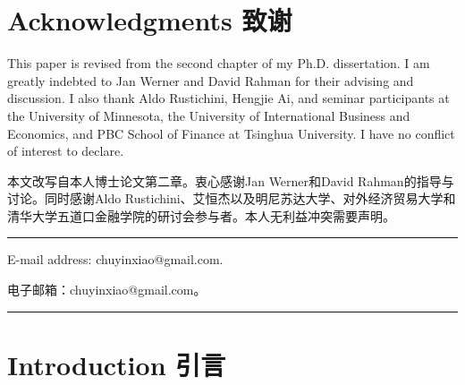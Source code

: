 \documentclass[12pt,a4paper]{article}
\newenvironment{original}{%
  \par\vspace{4pt}\noindent%
  \color{black}%
  \ignorespaces
}{%
  \par\vspace{2pt}%
}
\newenvironment{translation}{%
  \par\vspace{2pt}\noindent%
  \color{transblue}%
  \ignorespaces
}{%
  \par\vspace{4pt}\hrule\vspace{6pt}%
}
\begin{document}
\newpage

\section*{Acknowledgments \hfill 致谢}

\begin{original}
This paper is revised from the second chapter of my Ph.D. dissertation. I am greatly indebted to Jan Werner and David Rahman for their advising and discussion. I also thank Aldo Rustichini, Hengjie Ai, and seminar participants at the University of Minnesota, the University of International Business and Economics, and PBC School of Finance at Tsinghua University. I have no conflict of interest to declare.
\end{original}
\begin{translation}
本文改写自本人博士论文第二章。衷心感谢Jan Werner和David Rahman的指导与讨论。同时感谢Aldo Rustichini、艾恒杰以及明尼苏达大学、对外经济贸易大学和清华大学五道口金融学院的研讨会参与者。本人无利益冲突需要声明。
\end{translation}

\vspace{6pt}
\begin{original}
E-mail address: chuyinxiao@gmail.com.
\end{original}
\begin{translation}
电子邮箱：chuyinxiao@gmail.com。
\end{translation}

\newpage

\section{Introduction \hfill 引言}
\end{document}
